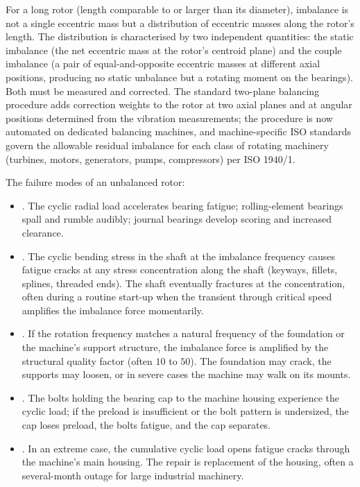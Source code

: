 For a long rotor (length comparable to or larger than its diameter),
imbalance is not a single eccentric mass but a distribution of
eccentric masses along the rotor's length. The distribution is
characterised by two independent quantities: the static imbalance
(the net eccentric mass at the rotor's centroid plane) and the
couple imbalance (a pair of equal-and-opposite eccentric masses at
different axial positions, producing no static unbalance but a
rotating moment on the bearings). Both must be measured and
corrected. The standard two-plane balancing procedure adds correction
weights to the rotor at two axial planes and at angular positions
determined from the vibration measurements; the procedure is now
automated on dedicated balancing machines, and machine-specific
ISO standards govern the allowable residual imbalance for each
class of rotating machinery (turbines, motors, generators, pumps,
compressors) per ISO 1940/1.

The failure modes of an unbalanced rotor:

\begin{itemize}[leftmargin=*]
  \item {}. The cyclic radial load accelerates
    bearing fatigue; rolling-element bearings spall and rumble
    audibly; journal bearings develop scoring and increased
    clearance.
  \item {}. The cyclic bending stress in the
    shaft at the imbalance frequency causes fatigue cracks at any
    stress concentration along the shaft (keyways, fillets,
    splines, threaded ends). The shaft eventually fractures at the
    concentration, often during a routine start-up when the
    transient through critical speed amplifies the imbalance force
    momentarily.
  \item {}. If the rotation frequency
    matches a natural frequency of the foundation or the machine's
    support structure, the imbalance force is amplified by the
    structural quality factor (often $10$ to $50$). The foundation
    may crack, the supports may loosen, or in severe cases the
    machine may walk on its mounts.
  \item {}. The bolts holding the bearing
    cap to the machine housing experience the cyclic load; if the
    preload is insufficient or the bolt pattern is undersized, the
    cap loses preload, the bolts fatigue, and the cap separates.
  \item {}. In an extreme case, the
    cumulative cyclic load opens fatigue cracks through the
    machine's main housing. The repair is replacement of the
    housing, often a several-month outage for large industrial
    machinery.
\end{itemize}

